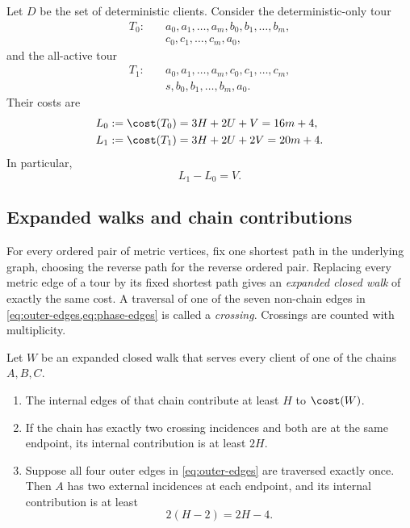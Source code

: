 Let $D$ be the set of deterministic clients.  Consider the deterministic-only
tour
\begin{equation}\label{eq:T0}
\begin{split}
  T_0:\quad
  &a_0,a_1,\ldots,a_m,
  b_0,b_1,\ldots,b_m,\\
  &c_0,c_1,\ldots,c_m,a_0,
\end{split}
\end{equation}
and the all-active tour
\begin{equation}\label{eq:T1}
\begin{split}
  T_1:\quad
  &a_0,a_1,\ldots,a_m,
  c_0,c_1,\ldots,c_m,\\
  &s,b_0,b_1,\ldots,b_m,a_0.
\end{split}
\end{equation}
Their costs are
\begin{align}
  L_0&:=\cost(T_0)=3H+2U+V=16m+4,
  \label{eq:L0}\\
  L_1&:=\cost(T_1)=3H+2U+2V=20m+4.
  \label{eq:L1}
\end{align}
In particular,
\begin{equation}\label{eq:Ldifference}
  L_1-L_0=V.
\end{equation}

\subsection{Expanded walks and chain contributions}

For every ordered pair of metric vertices, fix one shortest path in the
underlying graph, choosing the reverse path for the reverse ordered
pair.  Replacing every metric edge of a tour by its fixed shortest path gives
an \emph{expanded closed walk} of exactly the same cost.  A traversal of one
of the seven non-chain edges in \cref{eq:outer-edges,eq:phase-edges} is called
a \emph{crossing}.  Crossings are counted with multiplicity.

\begin{lemma}\label{lem:chain-contribution}
Let $W$ be an expanded closed walk that serves every client of one of the
chains $A,B,C$.
\begin{enumerate}[label=(\roman*)]
  \item The internal edges of that chain contribute at least $H$ to
  $\cost(W)$.
  \item If the chain has exactly two crossing incidences and both are at the
  same endpoint, its internal contribution is at least $2H$.
  \item Suppose all four outer edges in \cref{eq:outer-edges} are traversed
  exactly once.  Then $A$ has two external incidences at each endpoint, and
  its internal contribution is at least
  \[
    2(H-2)=2H-4.
  \]
\end{enumerate}
\end{lemma}

